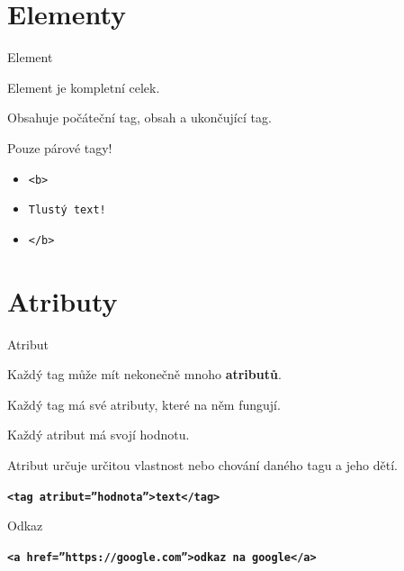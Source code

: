 \documentclass[aspectratio=169]{beamer}
\begin{document}
\section{Elementy}
\begin{frame}{Element}
    \begin{cardTiny}
        Element je kompletní celek.

        Obsahuje počáteční tag, obsah a ukončující tag.

        Pouze párové tagy!
    \end{cardTiny}
    \begin{cardTiny}
        \begin{itemize}
        \item \texttt{<b>}
        \item \texttt{Tlustý text!}
        \item \texttt{</b>}
        \end{itemize}
    \end{cardTiny}
\end{frame}



\section{Atributy}
\begin{frame}{Atribut}
    \begin{cardTiny}
        Každý tag může mít nekonečně mnoho \textbf{atributů}.

        Každý tag má své atributy, které na něm fungují. 

        Každý atribut má svojí hodnotu.

        Atribut určuje určitou vlastnost nebo chování daného tagu a jeho dětí.
    \end{cardTiny}
    \begin{cardTiny}
        \begin{center}
        \texttt{\textbf{<tag atribut=''hodnota''>text</tag>}}
        \end{center}
    \end{cardTiny}
\end{frame}

\begin{frame}{Odkaz}
    \begin{cardTiny}
        \begin{center}
        \texttt{\textbf{<a href=''https://google.com''>odkaz na google</a>}}
        \end{center}
    \end{cardTiny}
\end{frame}
\end{document}
